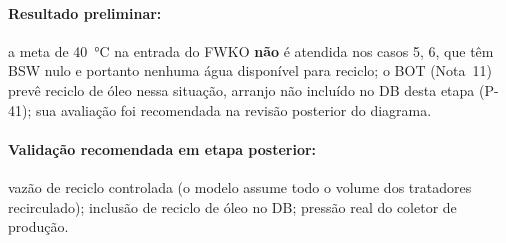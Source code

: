 \documentclass[11pt,a4paper]{article}
\numberwithin{equation}{section}
\numberwithin{table}{section}
\numberwithin{figure}{section}
\begin{document}
\paragraph{Resultado preliminar:} a meta de 40~\si{\celsius} na entrada do FWKO \textbf{não} é atendida nos casos 5, 6, que têm BSW nulo e portanto nenhuma água disponível para reciclo; o BOT (Nota~11) prevê reciclo de óleo nessa situação, arranjo não incluído no DB desta etapa (P-41); sua avaliação foi recomendada na revisão posterior do diagrama.
\paragraph{Validação recomendada em etapa posterior:} vazão de reciclo controlada (o modelo assume todo o volume dos tratadores recirculado); inclusão de reciclo de óleo no DB; pressão real do coletor de produção.
\end{document}
